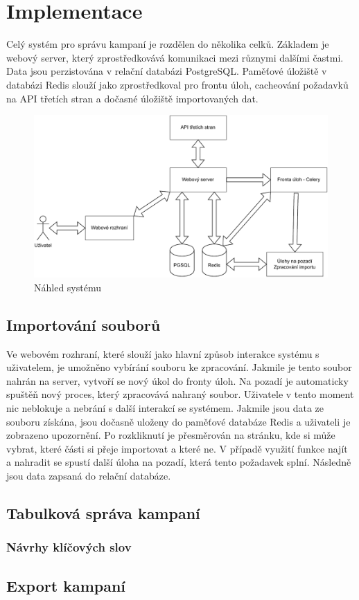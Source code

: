 \chapter{Implementace}
\label{chap:implementation}
Celý systém pro správu kampaní je rozdělen do několika celků. Základem je webový server, který zprostředkovává komunikaci mezi různymi dalšími častmi.
Data jsou perzistována v relační databázi PostgreSQL.
Paměťové úložiště v databázi Redis slouží jako zprostředkoval pro frontu úloh, cacheování požadavků na API třetích stran a dočasné úložiště importovaných dat.

\begin{figure}[h]
    \centering
    \includegraphics[width=1\textwidth]{Figures/system-overview.pdf}
    \caption{Náhled systému}
    \label{fig:system-overview}
\end{figure}

\section{Importování souborů}
Ve webovém rozhraní, které slouží jako hlavní způsob interakce systému s uživatelem, je umožněno vybírání souboru ke zpracování.
Jakmile je tento soubor nahrán na server, vytvoří se nový úkol do fronty úloh. Na pozadí je automaticky spuštěň nový proces, který
zpracovává nahraný soubor. Uživatele v tento moment nic neblokuje a nebrání s další interakcí se systémem. Jakmile jsou data ze souboru
získána, jsou dočasně uloženy do paměťové databáze Redis a uživateli je zobrazeno upozornění.
Po rozkliknutí je přesměrován na stránku, kde si může vybrat, které části si přeje importovat a které ne.
V případě využití funkce najít a nahradit se spustí další úloha na pozadí, která tento požadavek splní.
Následně jsou data zapsaná do relační databáze.


\section{Tabulková správa kampaní}

\subsection{Návrhy klíčových slov}

\section{Export kampaní}


\endinput